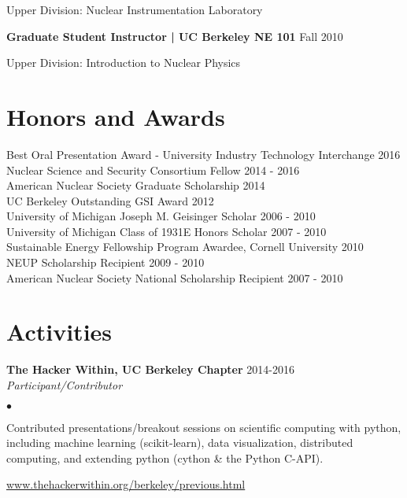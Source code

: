 \documentclass[margin,line]{res}
\newenvironment{list1}{
  \begin{list}{\ding{113}}{%
      \setlength{\itemsep}{0in}
      \setlength{\parsep}{0in} \setlength{\parskip}{0in}
      \setlength{\topsep}{0in} \setlength{\partopsep}{0in} 
      \setlength{\leftmargin}{0.17in}}}{\end{list}}
\newenvironment{list2}{
  \begin{list}{$\bullet$}{%
      \setlength{\itemsep}{0in}
      \setlength{\parsep}{0in} \setlength{\parskip}{0in}
      \setlength{\topsep}{0in} \setlength{\partopsep}{0in} 
      \setlength{\leftmargin}{0.2in}}}{\end{list}}
\begin{document}
\begin{resume}
\begin{list1}
  \item[] Upper Division: Nuclear Instrumentation Laboratory
\end{list1}
{\bf Graduate Student Instructor | UC Berkeley NE 101} \hfill Fall 2010

\begin{list1}
  \item[] Upper Division: Introduction to Nuclear Physics
\end{list1}

\section{\sc Honors and Awards} 

Best Oral Presentation Award - University Industry Technology Interchange \hfill 2016 \\
Nuclear Science and Security Consortium Fellow \hfill 2014 - 2016 \\
American Nuclear Society Graduate Scholarship \hfill 2014 \\
UC Berkeley Outstanding GSI Award \hfill 2012 \\
University of Michigan Joseph M. Geisinger Scholar \hfill 2006 - 2010 \\
University of Michigan Class of 1931E Honors Scholar \hfill 2007 - 2010 \\
Sustainable Energy Fellowship Program Awardee, Cornell University \hfill 2010 \\
NEUP Scholarship Recipient \hfill 2009 - 2010 \\
American Nuclear Society National Scholarship Recipient \hfill 2007 - 2010 \\

\section{\sc Activities}

{\bf The Hacker Within, UC Berkeley Chapter} \hfill 2014-2016 \\ 
{\em Participant/Contributor} 

\begin{list2}
  \item Contributed presentations/breakout sessions on scientific computing
        with python, including machine learning (scikit-learn), data
        visualization, distributed computing, and extending python 
        (cython \& the Python C-API).
  \item \url{www.thehackerwithin.org/berkeley/previous.html}
\end{list2}


\end{resume}
\end{document}
